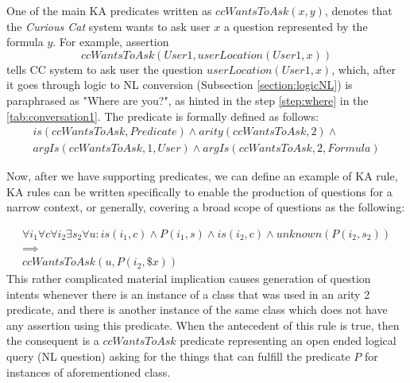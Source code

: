 \begin{definition}\label{def:pred_ccWantsToAsk}
One of the main KA predicates written as $ccWantsToAsk(x,y)$, denotes that the 
\emph{Curious Cat} system wants to ask user $x$ a question represented by the
formula $y$. For example, assertion 
\begin{equation*}
ccWantsToAsk(User1, userLocation(User1,x))
\end{equation*}
tells CC system to ask user the question $userLocation(User1,x)$, which,
after it goes through logic to NL conversion (Subsection \ref{section:logicNL}) is 
paraphrased as
"Where are you?", as hinted in the step \ref{step:where} in the 
\autoref{tab:conversation1}. The predicate is formally defined as follows:
\begin{equation}\label{as:ccWantsToAsk}
\begin{gathered}
	is(ccWantsToAsk,Predicate) \land arity(ccWantsToAsk,2) \land\\ 
	argIs(ccWantsToAsk,1,User) \land argIs(ccWantsToAsk,2,Formula)
\end{gathered}
\end{equation}
\end{definition}

Now, after we have supporting predicates, we can define an example of KA rule, 
KA rules can be written specifically to enable the production of questions for a narrow context, or generally, covering a broad scope of questions as the
following:

\begin{equation}\label{as:generalRule}
\begin{gathered}
\forall i_1 \forall c \forall i_2 \exists s_2 \forall u:is(i_1,c) \land P(i_1,s) \land is(i_2,c)\land unknown(P(i_2,s_2)) \\ 
	\implies \\
ccWantsToAsk(u,P(i_2,\$x))
\end{gathered}
\end{equation}
This rather complicated material implication causes generation of question 
intents whenever there is an instance of a class that was used in an arity 2 
predicate, and there is another instance of the same class which does not have 
any assertion using this predicate. When the antecedent of this rule is true,
then the consequent is a $ccWantsToAsk$ predicate representing an open
ended logical query (NL question) asking for the things that can fulfill the
predicate $P$ for instances of aforementioned class.

